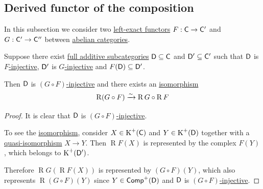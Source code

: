 \documentclass[../../main]{subfiles}
\begin{document}
\subsection{Derived functor of the composition}
In this subsection we consider two \hyperref[def:exact-functor]{left-exact functors} \(F: \category{C} \to \category{C'}\) and \(G: \category{C'} \to \category{C''}\) between \hyperref[def:abelian-category]{abelian categories}.

\begin{theorem}\label{thm:right-derived-functor-composition}
  Suppose there exist \hyperref[def:full-additive-subcategory]{full additive subcategories} \(\category{D} \subseteq \category{C}\) and \(\category{D'} \subseteq \category{C'}\) such that \(\category{D}\) is \hyperref[def:F-injective-subcategory]{\(F\)-injective}, \(\category{D'}\) is \hyperref[def:F-injective-subcategory]{\(G\)-injective} and \(F(\category{D}) \subseteq \category{D'}\).

  Then \(\category{D}\) is \hyperref[def:F-injective-subcategory]{\((G \circ F)\)-injective} and there exists an \hyperref[def:categorical-isomorphism]{isomorphism}
  \begin{equation*}
    \operatorname{R}(G \circ F) \isoarrow \operatorname{R}G \circ \operatorname{R}F
  \end{equation*}
\end{theorem}
\begin{proof}
  It is clear that \(\category{D}\) is \hyperref[def:F-injective-subcategory]{\((G \circ F)\)-injective}.

  To see the \hyperref[def:categorical-isomorphism]{isomorphism}, consider \(X \in \operatorname{K}^{+}(\category{C})\) and \(Y \in \operatorname{K}^{+}(\category{D})\) together with a \hyperref[def:quasi-isomorphism]{quasi-isomorphism} \(X \to Y\).
  Then \(\operatorname{R}F(X)\) is represented by the complex \(F(Y)\), which belongs to \(\operatorname{K}^{+}(\category{D'})\).

  Therefore \(\operatorname{R}G(\operatorname{R}F(X))\) is represented by \((G \circ F)(Y)\), which also represents \(\operatorname{R}(G \circ F)(Y)\) since \(Y \in \Complex[+]{\category{D}}\) and \(\category{D}\) is \hyperref[def:F-injective-subcategory]{\((G \circ F)\)-injective}.
\end{proof}
\end{document}

